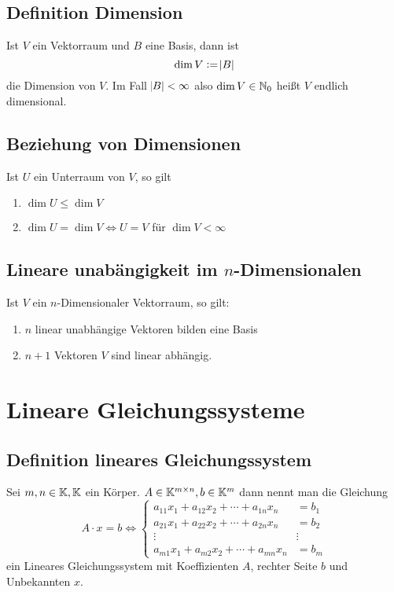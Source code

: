\subsection{Definition Dimension}
Ist $V$ ein Vektorraum und $B$ eine Basis, dann ist
\begin{equation*}
    \dim V := \abs{B}
\end{equation*}
die Dimension von $V$. Im Fall $\abs{B} < \infty$ also $\dim V \in \mathbb{N}_0$ heißt
$V$ endlich dimensional.

\subsection{Beziehung von Dimensionen}
Ist $U$ ein Unterraum von $V$, so gilt
\begin{enumerate}[label = (\alph*)]
    \item $\dim U \leq \dim V$
    \item $\dim U = \dim V \Leftrightarrow U = V$ für $\dim V < \infty$
\end{enumerate}

\subsection{Lineare unabängigkeit im $n$-Dimensionalen}
Ist $V$ ein $n$-Dimensionaler Vektorraum, so gilt:
\begin{enumerate}[label = (\alph*)]
    \item $n$ linear unabhängige Vektoren bilden eine Basis
    \item $n+1$ Vektoren $V$ sind linear abhängig.
\end{enumerate}

\section{Lineare Gleichungssysteme}
\subsection{Definition lineares Gleichungssystem}
Sei $m, n \in \mathbb{K}, \mathbb{K}$ ein Körper. $A \in \mathbb{K}^{m \times n}, b \in \mathbb{K}^m$ dann nennt
man die Gleichung
\begin{equation*}
    A \cdot x = b \Leftrightarrow
    \begin{cases}
        a_{11} x_1 + a_{12} x_2 + \cdots + a_{1n} x_n &= b_1\\
        a_{21} x_1 + a_{22} x_2 + \cdots + a_{2n} x_n &= b_2\\
        \vdots & \vdots \\
        a_{m1} x_1 + a_{m2} x_2 + \cdots + a_{mn} x_n &= b_m
    \end{cases}
\end{equation*}
ein Lineares Gleichungssystem mit Koeffizienten $A$, rechter Seite $b$ und
Unbekannten $x$.


